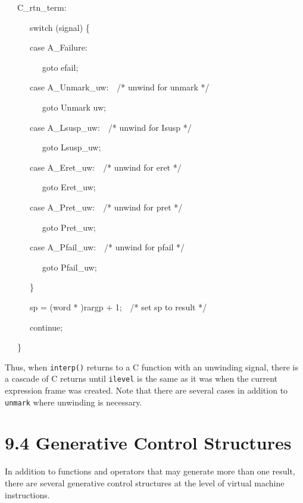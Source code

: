 {\ttfamily\mdseries
\ \ \ C\_rtn\_term:}

{\ttfamily\mdseries
\ \ \ \ \ \ switch (signal) \{}

{\ttfamily\mdseries
\ \ \ \ \ \ case A\_Failure:}

{\ttfamily\mdseries
\ \ \ \ \ \ \ \ \ goto efail;}

{\ttfamily\mdseries
\ \ \ \ \ \ case A\_Unmark\_uw:\ \ /* unwind for unmark */}

{\ttfamily\mdseries
\ \ \ \ \ \ \ \ \ goto Unmark uw;}

{\ttfamily\mdseries
\ \ \ \ \ \ case A\_Lsusp\_uw:\ \ /* unwind for Isusp */}

{\ttfamily\mdseries
\ \ \ \ \ \ \ \ \ goto Lsusp\_uw;}

{\ttfamily\mdseries
\ \ \ \ \ \ case A\_Eret\_uw:\ \ /* unwind for eret */}

{\ttfamily\mdseries
\ \ \ \ \ \ \ \ \ goto Eret\_uw;}

{\ttfamily\mdseries
\ \ \ \ \ \ case A\_Pret\_uw:\ \ /* unwind for pret */}

{\ttfamily\mdseries
\ \ \ \ \ \ \ \ \ goto Pret\_uw;}

{\ttfamily\mdseries
\ \ \ \ \ \ case A\_Pfail\_uw:\ \ /* unwind for pfail */}

{\ttfamily\mdseries
\ \ \ \ \ \ \ \ \ goto Pfail\_uw;}

{\ttfamily\mdseries
\ \ \ \ \ \ \}}

{\ttfamily\mdseries
\ \ \ \ \ \ sp = (word * )rargp + 1;\ \ /* set sp to result */}

{\ttfamily\mdseries
\ \ \ \ \ \ continue;}

{\ttfamily\mdseries
\ \ \ \}}


Thus, when \texttt{interp()} returns to a C function with an unwinding
signal, there is a cascade of C returns until \texttt{ilevel} is the
same as it was when the current expression frame was created. Note
that there are several cases in addition to \texttt{unmark} where
unwinding is necessary.

\section[9.4 Generative Control Structures]{9.4 Generative Control Structures}

In addition to functions and operators that may generate more than one
result, there are several generative control structures at the level
of virtual machine instructions.

